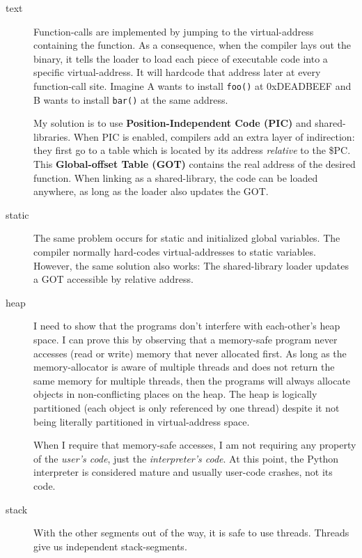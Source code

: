 \documentclass[letterpaper,twocolumn,10pt]{article}
\newcommand{\citeme}{}
\begin{document}
\begin{description}
\item[text]
Function-calls are implemented by jumping to the virtual-address containing the function.
As a consequence, when the compiler lays out the binary, it tells the loader to load each piece of executable code into a specific virtual-address.
It will hardcode that address later at every function-call site.
Imagine A wants to install \texttt{foo()} at 0xDEADBEEF and B wants to install \texttt{bar()} at the same address.

My solution is to use \textbf{Position-Independent Code (PIC)} and shared-libraries\citeme.
When PIC is enabled, compilers add an extra layer of indirection: they first go to a table which is located by its address \textit{relative} to the \$PC. This \textbf{Global-offset Table (GOT)} contains the real address of the desired function.
When linking as a shared-library, the code can be loaded anywhere, as long as the loader also updates the GOT.

\item[static]
The same problem occurs for static and initialized global variables.
The compiler normally hard-codes virtual-addresses to static variables.
However, the same solution also works:
The shared-library loader updates a GOT accessible by relative address.

\item[heap]
I need to show that the programs don't interfere with each-other's heap space.
I can prove this by observing that a memory-safe program never accesses (read or write) memory that never allocated first.
As long as the memory-allocator is aware of multiple threads and does not return the same memory for multiple threads, then the programs will always allocate objects in non-conflicting places on the heap.
The heap is logically partitioned (each object is only referenced by one thread) despite it not being literally partitioned in virtual-address space.

When I require that memory-safe accesses, I am not requiring any property of the \textit{user's code}, just the \textit{interpreter's code}.
At this point, the Python interpreter is considered mature and usually user-code crashes, not its code.

\item[stack]
With the other segments out of the way, it is safe to use threads.
Threads give us independent stack-segments.
\end{description}
\end{document}
